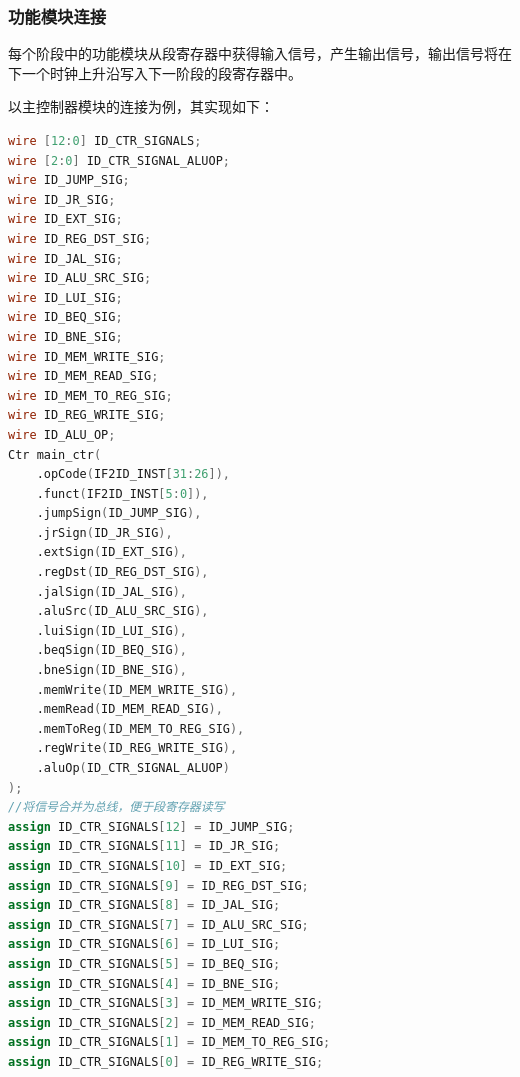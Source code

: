 \documentclass[UTF8]{ctexart}
\begin{document}
\subsubsection{功能模块连接}
每个阶段中的功能模块从段寄存器中获得输入信号，产生输出信号，输出信号将在下一个时钟上升沿写入下一阶段的段寄存器中。\par
以主控制器模块的连接为例，其实现如下：
\begin{lstlisting}[language=verilog]
wire [12:0] ID_CTR_SIGNALS;
wire [2:0] ID_CTR_SIGNAL_ALUOP;
wire ID_JUMP_SIG;
wire ID_JR_SIG;
wire ID_EXT_SIG;
wire ID_REG_DST_SIG;
wire ID_JAL_SIG;
wire ID_ALU_SRC_SIG;
wire ID_LUI_SIG;
wire ID_BEQ_SIG;
wire ID_BNE_SIG;
wire ID_MEM_WRITE_SIG;
wire ID_MEM_READ_SIG;
wire ID_MEM_TO_REG_SIG;
wire ID_REG_WRITE_SIG;
wire ID_ALU_OP;
Ctr main_ctr(
    .opCode(IF2ID_INST[31:26]),
    .funct(IF2ID_INST[5:0]),
    .jumpSign(ID_JUMP_SIG),
    .jrSign(ID_JR_SIG),
    .extSign(ID_EXT_SIG),
    .regDst(ID_REG_DST_SIG),
    .jalSign(ID_JAL_SIG),
    .aluSrc(ID_ALU_SRC_SIG),
    .luiSign(ID_LUI_SIG),
    .beqSign(ID_BEQ_SIG),
    .bneSign(ID_BNE_SIG),
    .memWrite(ID_MEM_WRITE_SIG),
    .memRead(ID_MEM_READ_SIG),
    .memToReg(ID_MEM_TO_REG_SIG),
    .regWrite(ID_REG_WRITE_SIG),
    .aluOp(ID_CTR_SIGNAL_ALUOP)
);
//将信号合并为总线，便于段寄存器读写
assign ID_CTR_SIGNALS[12] = ID_JUMP_SIG;
assign ID_CTR_SIGNALS[11] = ID_JR_SIG;
assign ID_CTR_SIGNALS[10] = ID_EXT_SIG;
assign ID_CTR_SIGNALS[9] = ID_REG_DST_SIG;
assign ID_CTR_SIGNALS[8] = ID_JAL_SIG;
assign ID_CTR_SIGNALS[7] = ID_ALU_SRC_SIG;
assign ID_CTR_SIGNALS[6] = ID_LUI_SIG;
assign ID_CTR_SIGNALS[5] = ID_BEQ_SIG;
assign ID_CTR_SIGNALS[4] = ID_BNE_SIG;
assign ID_CTR_SIGNALS[3] = ID_MEM_WRITE_SIG;
assign ID_CTR_SIGNALS[2] = ID_MEM_READ_SIG;
assign ID_CTR_SIGNALS[1] = ID_MEM_TO_REG_SIG;
assign ID_CTR_SIGNALS[0] = ID_REG_WRITE_SIG;
\end{lstlisting}
\end{document}
